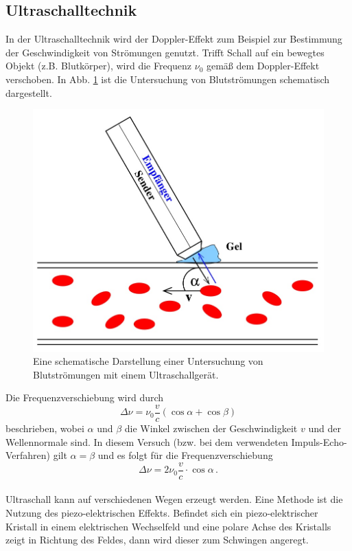 \subsection{Ultraschalltechnik}
In der Ultraschalltechnik wird der Doppler-Effekt zum Beispiel zur Bestimmung der Geschwindigkeit von Strömungen genutzt.
Trifft Schall auf ein bewegtes Objekt (z.B. Blutkörper), wird die Frequenz $\nu_0$ gemäß dem Doppler-Effekt verschoben.
In Abb. \ref{fig:ultraschall_schematisch} ist die Untersuchung von Blutströmungen schematisch dargestellt.
\newpage
\begin{figure}
    \centering
    \includegraphics[width=0.75\linewidth]{content/data/ultraschall_schematisch.jpg}
    \caption{Eine schematische Darstellung einer Untersuchung von Blutströmungen mit einem Ultraschallgerät. \cite[1]{anleitung}}
    \label{fig:ultraschall_schematisch}
\end{figure}
Die Frequenzverschiebung wird durch
\begin{equation*}
    \Delta \nu = \nu_0 \frac{v}{c} \left ( \cos \alpha + \cos \beta \right )
\end{equation*}
beschrieben, wobei $\alpha$ und $\beta$ die Winkel zwischen der Geschwindigkeit $v$ und der Wellennormale sind.
In diesem Versuch (bzw. bei dem verwendeten Impuls-Echo-Verfahren) gilt $\alpha = \beta$ und es folgt für die Frequenzverschiebung
\begin{equation}
    \Delta \nu = 2 \nu_0 \frac{v}{c} \cdot \cos \alpha \, .
    \label{eqn:frequenzverschiebung}
\end{equation}
\\
Ultraschall kann auf verschiedenen Wegen erzeugt werden.
Eine Methode ist die Nutzung des piezo-elektrischen Effekts.
Befindet sich ein piezo-elektrischer Kristall in einem elektrischen Wechselfeld und eine polare Achse des Kristalls zeigt in Richtung des Feldes, dann wird dieser zum Schwingen angeregt.
